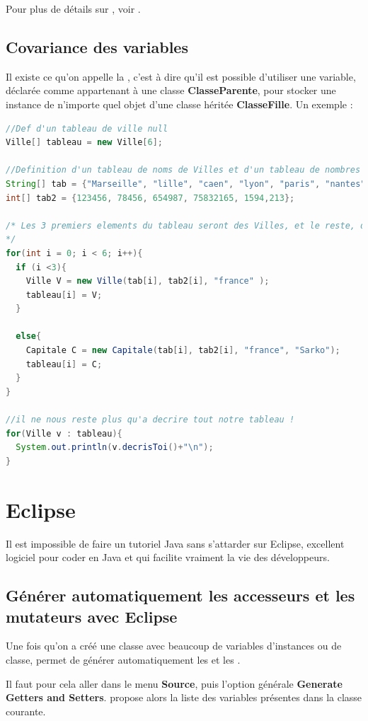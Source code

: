 \documentclass[a4paper,twoside]{article}
\begin{document}
Pour plus de détails sur , voir .

\subsection{Covariance des variables}
Il existe ce qu'on appelle la , c'est à dire qu'il est possible d'utiliser une variable, déclarée comme appartenant à une classe \textbf{ClasseParente}, pour stocker une instance de n'importe quel objet d'une classe héritée \textbf{ClasseFille}. Un exemple :
\begin{lstlisting}[language=java]
//Def d'un tableau de ville null
Ville[] tableau = new Ville[6];
    
//Definition d'un tableau de noms de Villes et d'un tableau de nombres d'habitants
String[] tab = {"Marseille", "lille", "caen", "lyon", "paris", "nantes"};
int[] tab2 = {123456, 78456, 654987, 75832165, 1594,213};

/* Les 3 premiers elements du tableau seront des Villes, et le reste, des capitales
*/
for(int i = 0; i < 6; i++){
  if (i <3){
    Ville V = new Ville(tab[i], tab2[i], "france" );
    tableau[i] = V;
  }

  else{
    Capitale C = new Capitale(tab[i], tab2[i], "france", "Sarko");
    tableau[i] = C;
  }
}

//il ne nous reste plus qu'a decrire tout notre tableau !
for(Ville v : tableau){
  System.out.println(v.decrisToi()+"\n");
}
\end{lstlisting}

\section{Eclipse}
Il est impossible de faire un tutoriel Java sans s'attarder sur Eclipse, excellent logiciel pour coder en Java et qui facilite vraiment la vie des développeurs.

\subsection{Générer automatiquement les accesseurs et les mutateurs avec Eclipse}
Une fois qu'on a créé une classe avec beaucoup de variables d'instances ou de classe,  permet de générer automatiquement les  et les . 

Il faut pour cela aller dans le menu \textbf{Source}, puis l'option générale \textbf{Generate Getters and Setters}.  propose alors la liste des variables présentes dans la classe courante.
\end{document}
